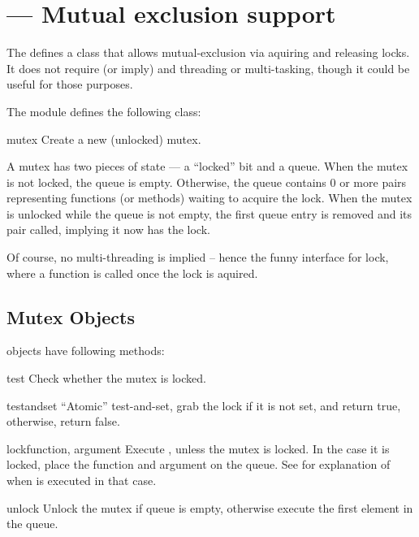 \section{ ---
         Mutual exclusion support}


The  defines a class that allows mutual-exclusion
via aquiring and releasing locks. It does not require (or imply)
and threading or multi-tasking, though it could be useful for
those purposes.

The  module defines the following class:

\begin{classdesc}{mutex}{}
Create a new (unlocked) mutex.

A mutex has two pieces of state --- a ``locked'' bit and a queue.
When the mutex is not locked, the queue is empty.
Otherwise, the queue contains 0 or more 
 pairs
representing functions (or methods) waiting to acquire the lock.
When the mutex is unlocked while the queue is not empty,
the first queue entry is removed and its 
 pair called,
implying it now has the lock.

Of course, no multi-threading is implied -- hence the funny interface
for lock, where a function is called once the lock is aquired.
\end{classdesc}


\subsection{Mutex Objects \label{mutex-objects}}

 objects have following methods:

\begin{methoddesc}{test}{}
Check whether the mutex is locked.
\end{methoddesc}

\begin{methoddesc}{testandset}{}
``Atomic'' test-and-set, grab the lock if it is not set,
and return true, otherwise, return false.
\end{methoddesc}

\begin{methoddesc}{lock}{function, argument}
Execute , unless the mutex is locked.
In the case it is locked, place the function and argument on the queue.
See  for explanation of when
 is executed in that case.
\end{methoddesc}

\begin{methoddesc}{unlock}{}
Unlock the mutex if queue is empty, otherwise execute the first element
in the queue.
\end{methoddesc}
